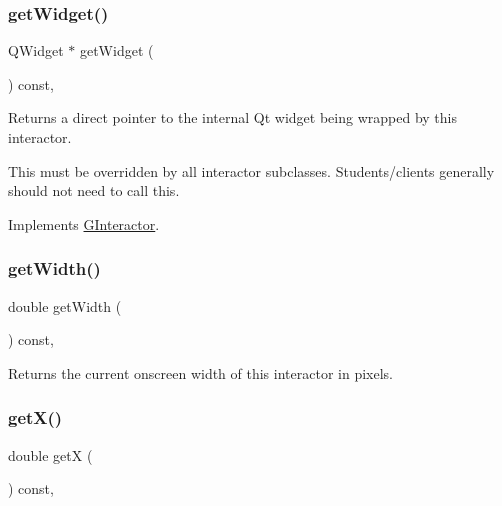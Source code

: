 \subsubsection{\texorpdfstring{get\+Widget()}{getWidget()}}
{\footnotesize\ttfamily Q\+Widget $\ast$ get\+Widget (\begin{DoxyParamCaption}{ }\end{DoxyParamCaption}) const\hspace{0.3cm}{\ttfamily [override]}, {\ttfamily [virtual]}}



Returns a direct pointer to the internal Qt widget being wrapped by this interactor. 

This must be overridden by all interactor subclasses. Students/clients generally should not need to call this. 

Implements \mbox{\hyperlink{classsgl_1_1GInteractor}{G\+Interactor}}.

\mbox{\label{classsgl_1_1GInteractor_a0ed2965abd4f5701d2cadf71239faf19}} 
\subsubsection{\texorpdfstring{get\+Width()}{getWidth()}}
{\footnotesize\ttfamily double get\+Width (\begin{DoxyParamCaption}{ }\end{DoxyParamCaption}) const\hspace{0.3cm}{\ttfamily [virtual]}, {\ttfamily [inherited]}}



Returns the current onscreen width of this interactor in pixels. 

\mbox{\label{classsgl_1_1GInteractor_a344385751bee0720059403940d57a13e}} 
\subsubsection{\texorpdfstring{get\+X()}{getX()}}
{\footnotesize\ttfamily double getX (\begin{DoxyParamCaption}{ }\end{DoxyParamCaption}) const\hspace{0.3cm}{\ttfamily [virtual]}, {\ttfamily [inherited]}}




